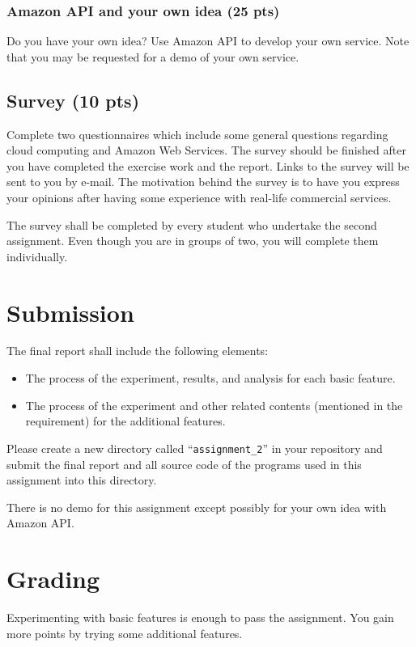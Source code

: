 \documentclass[12pt, a4paper]{article}
\begin{document}
\subsubsection{Amazon API and your own idea (25 pts)}
Do you have your own idea?
Use Amazon API to develop your own service.
Note that you may be requested for a demo of your own service.

\subsection{Survey (10 pts)}
Complete two questionnaires which include some general questions regarding cloud computing and Amazon Web Services.
The survey should be finished after you have completed the exercise work and the report.
Links to the survey will be sent to you by e-mail.
The motivation behind the survey is to have you express your opinions after having some experience with real-life commercial services.

The survey shall be completed by every student who undertake the second assignment.
Even though you are in groups of two, you will complete them individually.

\section{Submission}
The final report shall include the following elements:

\begin{itemize}
\item The process of the experiment, results, and analysis for each basic feature.
\item The process of the experiment and other related contents (mentioned in the requirement) for the additional features.
\end{itemize}

Please create a new directory called ``\texttt{assignment\_2}'' in your repository and submit the final report and all source code of the programs used in this assignment into this directory.

There is no demo for this assignment except possibly for your own idea with Amazon API.

\section{Grading}
Experimenting with basic features is enough to pass the assignment.
You gain more points by trying some additional features.
\end{document}
